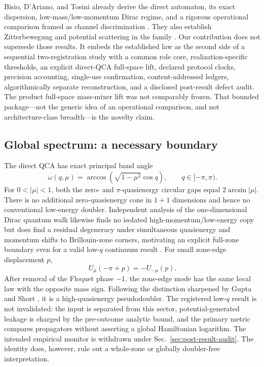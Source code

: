 Bisio, D'Ariano, and Tosini already derive the direct automaton, its exact
dispersion, low-mass/low-momentum Dirac regime, and a rigorous operational
comparison framed as channel discrimination
\citep{Bisio2015QuantumFieldQCA}.  They also establish Zitterbewegung and
potential scattering in the family \citep{Bisio2013DiracQCADynamics}.  Our
contribution does not supersede those results.  It embeds the established law
as the second side of a sequential two-registration study with a common role
core, realization-specific thresholds, an explicit direct-QCA full-space lift,
declared protocol clocks, precision accounting, single-use confirmation,
content-addressed ledgers, algorithmically separate reconstruction, and a
disclosed post-result defect audit.  The product full-space mass-mixer lift was
not comparably frozen.  That bounded package---not the generic idea of an
operational comparison, and not architecture-class breadth---is the novelty
claim.

\subsection{Global spectrum: a necessary boundary}

The direct QCA has exact principal band angle
\begin{equation}
 \omega(q,\mu)=\arccos\!\left(\sqrt{1-\mu^2}\cos q\right),
 \qquad q\in[-\pi,\pi).
 \label{eq:dispersion}
\end{equation}
For $0<|\mu|<1$, both the zero- and $\pi$-quasienergy circular gaps equal
$2\arcsin|\mu|$.  There is no additional zero-quasienergy cone in $1+1$
dimensions and hence no conventional low-energy doubler.  Independent
analysis of the one-dimensional Dirac quantum walk likewise finds no isolated
high-momentum/low-energy copy but does find a residual degeneracy under
simultaneous quasienergy and momentum shifts to Brillouin-zone corners,
motivating an explicit full-zone boundary even for a valid low-$q$ continuum
result \citep{Bakircioglu2025DoublingQCA}.  For
small zone-edge displacement $p$,
\begin{equation}
 U_\mu(-\pi+p)=-U_{-\mu}(p).
 \label{eq:pi-partner}
\end{equation}
After removal of the Floquet phase $-1$, the zone-edge mode has the same local
law with the opposite mass sign.  Following the distinction sharpened by
Gupta and Short \citep{Gupta2026FermionDoubling,Gupta2025DiracVacuum}, it is a
high-quasienergy pseudodoubler.  The registered low-$q$ result is not
invalidated: the input is separated from this sector, potential-generated
leakage is charged by the pre-outcome analytic bound, and the primary metric
compares propagators without asserting a global Hamiltonian logarithm.  The
intended empirical monitor is withdrawn under
Sec.~\ref{sec:post-result-audit}.  The identity
does, however, rule out a whole-zone or globally doubler-free interpretation.

